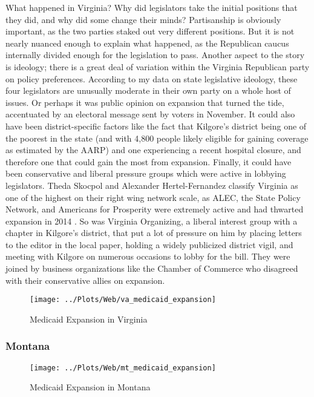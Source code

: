 \documentclass[
  oneside]{book}
\begin{document}
What happened in Virginia? Why did legislators take the initial positions that they did, and why did some change their minds? Partisanship is obviously important, as the two parties staked out very different positions. But it is not nearly nuanced enough to explain what happened, as the Republican caucus internally divided enough for the legislation to pass. Another aspect to the story is ideology; there is a great deal of variation within the Virginia Republican party on policy preferences. According to my data on state legislative ideology, these four legislators are unusually moderate in their own party on a whole host of issues. Or perhaps it was public opinion on expansion that turned the tide, accentuated by an electoral message sent by voters in November. It could also have been district-specific factors like the fact that Kilgore's district being one of the poorest in the state (and with 4,800 people likely eligible for gaining coverage as estimated by the AARP) and one experiencing a recent hospital closure, and therefore one that could gain the most from expansion. Finally, it could have been conservative and liberal pressure groups which were active in lobbying legislators. Theda Skocpol and Alexander Hertel-Fernandez classify Virginia as one of the highest on their right wing network scale, as ALEC, the State Policy Network, and Americans for Prosperity were extremely active and had thwarted expansion in 2014 \citep{Hertel-Fernandez:2016}. So was Virginia Organizing, a liberal interest group with a chapter in Kilgore's district, that put a lot of pressure on him by placing letters to the editor in the local paper, holding a widely publicized district vigil, and meeting with Kilgore on numerous occasions to lobby for the bill. They were joined by business organizations like the Chamber of Commerce who disagreed with their conservative allies on expansion.

\begin{figure}
\texttt{[image: ../Plots/Web/va\_medicaid\_expansion]} \caption{Medicaid Expansion in Virginia}\label{fig:medicaid-expansion-va}
\end{figure}

\hypertarget{montana}{%
\subsubsection{Montana}\label{montana}}

\begin{figure}
\texttt{[image: ../Plots/Web/mt\_medicaid\_expansion]} \caption{Medicaid Expansion in Montana}\label{fig:medicaid-expansion-mt}
\end{figure}
\end{document}
